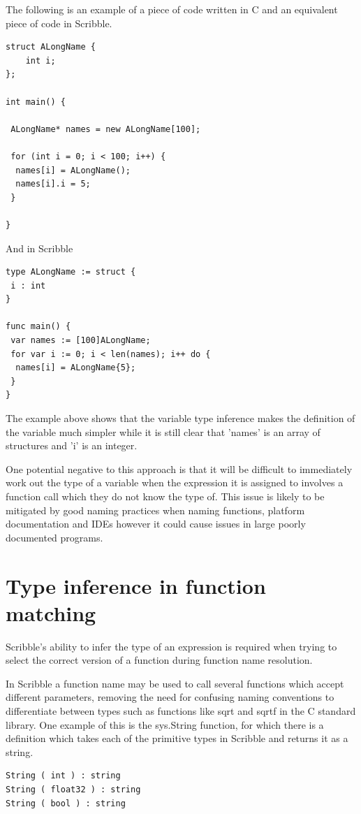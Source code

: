 \documentclass[]{final_report}
\begin{document}
The following is an example of a piece of code written in C and an equivalent piece of code in Scribble.

\begin{verbatim}
struct ALongName {
	int i;
};

int main() {

 ALongName* names = new ALongName[100];
 
 for (int i = 0; i < 100; i++) {
  names[i] = ALongName();
  names[i].i = 5;
 }

}
\end{verbatim}
And in Scribble
\begin{verbatim}
type ALongName := struct {
 i : int
}

func main() {
 var names := [100]ALongName;
 for var i := 0; i < len(names); i++ do {
  names[i] = ALongName{5};
 }
}
\end{verbatim}

The example above shows that the variable type inference makes the definition of the variable much simpler while it is still clear that 'names' is an array of structures and 'i' is an integer.

One potential negative to this approach is that it will be difficult to immediately work out the type of a variable when the expression it is assigned to involves a function call which they do not know the type of. This issue is likely to be mitigated by good naming practices when naming functions, platform documentation and IDEs however it could cause issues in large poorly documented programs.

\section{Type inference in function matching}

Scribble's ability to infer the type of an expression is required when trying to select the correct version of a function during function name resolution. 

In Scribble a function name may be used to call several functions which accept different parameters, removing the need for confusing naming conventions to differentiate between types such as functions like sqrt and sqrtf in the C standard library. One example of this is the sys.String function, for which there is a definition which takes each of the primitive types in Scribble and returns it as a string.

\begin{verbatim}
String ( int ) : string
String ( float32 ) : string
String ( bool ) : string
\end{verbatim}
\end{document}
